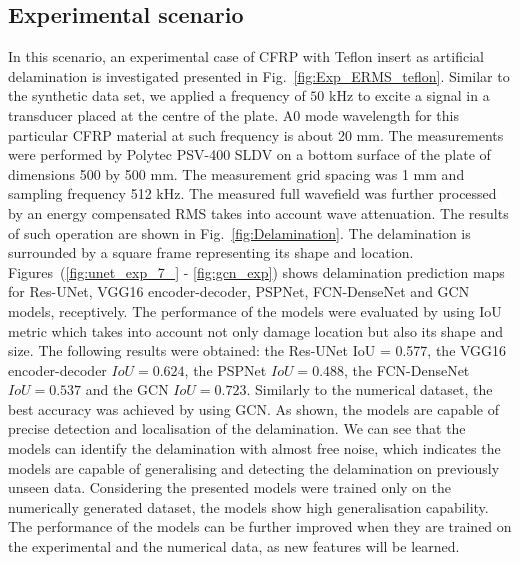 \subsection{Experimental scenario}
In this scenario, an experimental case of CFRP with Teflon insert as artificial delamination is investigated presented in Fig.~\ref{fig:Exp_ERMS_teflon}. 
Similar to the synthetic data set, we applied a frequency of \(50\) kHz to excite a signal in a transducer placed at the centre of the plate. 
A0 mode wavelength for this particular CFRP material at such frequency is about 20 mm. 
The measurements were performed by Polytec PSV-400 SLDV on a bottom surface of the plate of dimensions 500 by 500 mm. 
The measurement grid spacing was 1 mm and sampling frequency 512 kHz. 
The measured full wavefield was further processed by an energy compensated RMS takes into account wave attenuation. 
The results of such operation are shown in Fig.~\ref{fig:Delamination}.
The delamination is surrounded by a square frame representing its shape and location. 
Figures~(\ref{fig:unet_exp_7_} - \ref{fig:gcn_exp}) shows delamination prediction maps for Res-UNet, VGG16 encoder-decoder, PSPNet, FCN-DenseNet and GCN models, receptively.
The performance of the models were evaluated by using IoU metric which takes into account not only damage location but also its shape and size. 
The following results were obtained: the Res-UNet IoU = 0.577, the VGG16 encoder-decoder \(IoU = 0.624\), the
PSPNet \(IoU = 0.488\), the FCN-DenseNet \(IoU = 0.537\) and the GCN \(IoU =
0.723\). 
Similarly to the numerical dataset, the best accuracy was achieved by using GCN.
As shown, the models are capable of precise detection and localisation of the delamination. 
We can see that the models can identify the delamination with almost free noise, which indicates the models are capable of generalising and detecting the delamination on previously unseen data. 
Considering the presented models were trained only on the numerically generated dataset, the models show high generalisation capability.
The performance of the models can be further improved when they are trained on the experimental and the numerical data, as new features will be learned. 
